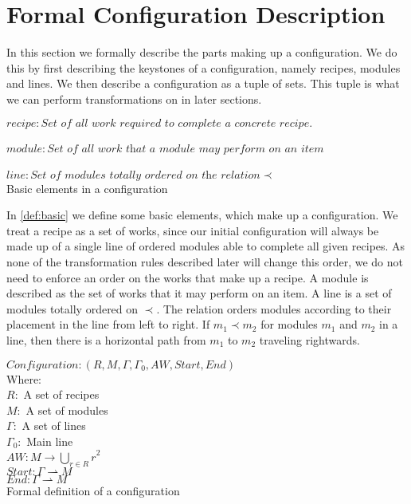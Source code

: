 \section{Formal Configuration Description} \label{sec:math_rules}
In this section we formally describe the parts making up a configuration. We do this by first describing the keystones of a configuration, namely recipes, modules and lines. We then describe a configuration as a tuple of sets. This tuple is what we can perform transformations on in later sections.

\begin{definition}[htb]
$recipe: \textit{Set of all work required to complete a concrete recipe.}$
\\ \\
$module: \textit{Set of all work that a module may perform on an item}$
\\ \\
$line: \textit{Set of modules totally ordered on the relation} \prec$
\\
\caption{Basic elements in a configuration}
\label{def:basic}
\end{definition}


In \cref{def:basic} we define some basic elements, which make up a configuration. We treat a recipe as a set of works, since our initial configuration will always be made up of a single line of ordered modules able to complete all given recipes. As none of the transformation rules described later will change this order, we do not need to enforce an order on the works that make up a recipe. A module is described as the set of works that it may perform on an item. A line is a set of modules totally ordered on $\prec$. The relation orders modules according to their placement in the line from left to right. If $m_1 \prec m_2$ for modules $m_1$ and $m_2$ in a line, then there is a horizontal path from $m_1$ to $m_2$ traveling rightwards. 

\begin{definition}[htb]
$Configuration: (R, M , \Gamma, \Gamma_0, AW, Start, End)$
\\
Where: \\
$R:$ A set of recipes \\
$M:$ A set of modules \\
$\Gamma:$ A set of lines \\
$\Gamma_0:$ Main line \\
$AW: M \rightarrow {\bigcup_{r\in R}r}^2$ \\ 
$Start: \Gamma \rightharpoonup M$ \\
$End: \Gamma \rightharpoonup M$ \\
\caption{Formal definition of a configuration}
\label{def:config}
\end{definition}

